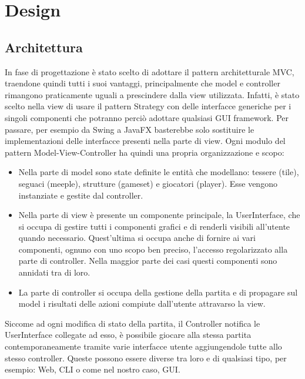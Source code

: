 \section{Design}
\subsection{Architettura}

In fase di progettazione è stato scelto di adottare il pattern architetturale MVC, traendone quindi tutti i suoi vantaggi, principalmente che model e controller rimangono praticamente uguali a prescindere dalla view utilizzata. Infatti, è stato scelto nella view di usare il pattern Strategy con delle interfacce generiche per i singoli componenti che potranno perciò adottare qualsiasi GUI framework. Per passare, per esempio da Swing a JavaFX basterebbe solo sostituire le implementazioni delle interfacce presenti nella parte di view. Ogni modulo del pattern Model-View-Controller ha quindi una propria organizzazione e scopo:
\begin{itemize}
    \item Nella parte di model sono state definite le entità che modellano: tessere (tile), seguaci (meeple), strutture (gameset) e giocatori (player). Esse vengono instanziate e gestite dal controller.
    \item Nella parte di view è presente un componente principale, la UserInterface, che si occupa di gestire tutti i componenti grafici e di renderli visibili all'utente quando necessario. Quest'ultima si occupa anche di fornire ai vari componenti, ognuno con uno scopo ben preciso, l'accesso regolarizzato alla parte di controller. Nella maggior parte dei casi questi componenti sono annidati tra di loro.
    \item La parte di controller si occupa della gestione della partita e di propagare sul model i risultati delle azioni compiute dall'utente attravarso la view.
\end{itemize}
Siccome ad ogni modifica di stato della partita, il Controller notifica le UserInterface collegate ad esso, è possibile giocare alla stessa partita contemporaneamente tramite varie interfacce utente aggiungendole tutte allo stesso controller. Queste possono essere diverse tra loro e di qualsiasi tipo, per esempio: Web, CLI o come nel nostro caso, GUI.


